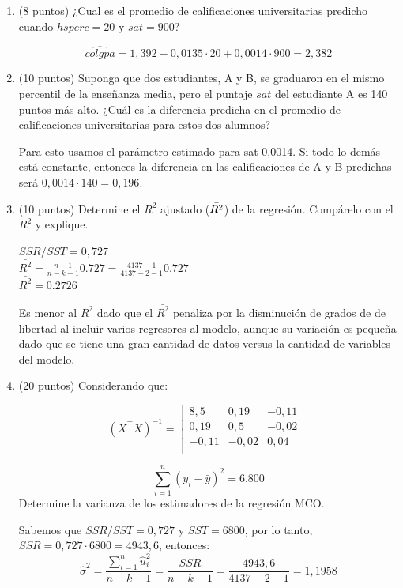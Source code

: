 \documentclass[10pt,a4paper]{article}
\begin{document}
\begin{enumerate}
\begin{enumerate}
{\color{blue} Un valor  bajo en $hsperc$, implica que el estudiante obtuvo alguno de los mejores resultados de su clase. Se espera que los mejores estudiantes del colegio, también tengan buenas calificaciones en la universidad.  }
\item  (8 puntos) ¿Cual es el promedio de calificaciones universitarias predicho cuando $hsperc= 20$ y $sat=900$?

{\color{blue} $$\hat{colgpa} =1,392 -0,0135 \cdot 20 + 0,0014 \cdot 900=2,382$$}


\item (10 puntos) Suponga que dos estudiantes, A y B, se graduaron en el mismo percentil de la enseñanza media, pero el puntaje $sat$ del estudiante A es 140 puntos más alto. ¿Cuál es la diferencia predicha en el promedio
de calificaciones universitarias para estos dos alumnos? 

{\color{blue} Para esto usamos el parámetro estimado para sat 0,0014. Si todo lo demás está constante, entonces la diferencia en las calificaciones de A y B predichas será $0,0014\cdot 140=0,196$.}

\item (10 puntos) Determine el $R^2$ ajustado ($\Bar{R^2}$) de la regresión. Compárelo con el $R^2$ y explique.

{\color{blue}
$SSR/SST=	0,727$\\
$\bar{R^2}=\frac{n-1}{n-k-1}0.727=\frac{4137-1}{4137-2-1}0.727$\\
$\bar{R^2}=0.2726$

Es menor al $R^2$ dado que el $\bar{R^2}$ penaliza por la disminución de grados de de libertad al incluir varios regresores al modelo, aunque su variación es pequeña dado que se tiene una gran cantidad de datos versus la cantidad de variables del modelo.}

\item (20 puntos) Considerando que:

\[(X^\top X)^{-1} =
\begin{bmatrix}
8,5 & 0,19 & -0,11 \\
0,19 & 0,5 & -0,02 \\
-0,11 & -0,02 & 0,04 \\
\end{bmatrix}
\]

$$ \sum_{i=1}^{n} (y_i - \bar{y})^2=6.800$$
Determine la varianza de los estimadores de la regresión MCO.

{\color{blue} 
Sabemos que $SSR/SST = 0,727$ y $SST=6800$, por lo tanto, $SSR = 0,727\cdot 6800=4943,6 $, entonces:
$$\hat{\sigma}^2 = \frac{\sum_{i=1}^{n} \hat{u}_i^2 }{n-k-1}= \frac{SSR}{n - k - 1}=\frac{4943,6}{4137-2-1}=1,1958$$
    
}
\end{enumerate}
\end{enumerate}
\end{document}
